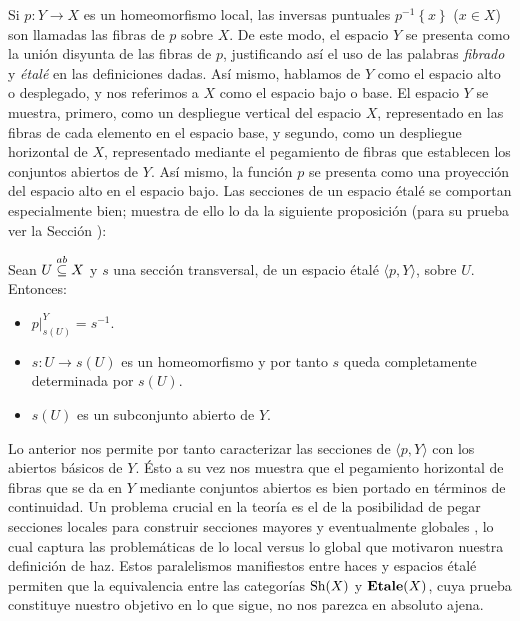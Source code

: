 Si $p:Y\to X$ es un homeomorfismo local, las inversas puntuales $p^{-1}\left\lbrace x\right\rbrace$ ($x\in X$) son llamadas las fibras de $p$ sobre $X$. De este modo, el espacio $Y$ se presenta como la unión disyunta de las fibras de $p$, justificando así el uso de las palabras \textit{fibrado} y \textit{étalé} en las definiciones dadas. Así mismo, hablamos de $Y$ como el espacio alto o desplegado, y nos referimos a $X$ como el espacio bajo o base. El espacio $Y$ se muestra, primero, como un despliegue vertical del espacio $X$, representado en las fibras de cada elemento en el espacio base, y segundo, como un despliegue horizontal de $X$, representado mediante el pegamiento de fibras que establecen los conjuntos abiertos de $Y$. Así mismo, la función $p$ se presenta como una proyección del espacio alto en el espacio bajo. Las secciones de un espacio étalé se comportan especialmente bien; muestra de ello lo da la siguiente proposición (para su prueba ver la Sección ):
\begin{Prop}
   Sean $U\stackrel{ab}{\subseteq} X$ y $s$ una sección transversal, de un espacio étalé $\langle p, Y\rangle$, sobre $U$. Entonces:
   \begin{itemize}
      \item $p|^{Y}_{s(U)}=s^{-1}$.
      \item $s:U\to s(U)$ es un homeomorfismo y por tanto $s$ queda completamente determinada por $s(U)$.
      \item $s(U)$ es un subconjunto abierto de $Y$.
   \end{itemize}
\end{Prop}
Lo anterior nos permite por tanto caracterizar las secciones de $\langle p, Y\rangle$ con los abiertos básicos de $Y$. Ésto a su vez nos muestra que el pegamiento horizontal de fibras que se da en $Y$ mediante conjuntos abiertos es bien portado en términos de continuidad. Un problema crucial en la teoría es el de la posibilidad de pegar secciones locales para construir secciones mayores y eventualmente globales \cite{MHPM}, lo cual captura las problemáticas de lo local versus lo global que motivaron nuestra definición de haz. Estos paralelismos manifiestos entre haces y espacios étalé permiten que la equivalencia entre las categorías $\normalfont{\text{Sh}} (X)$ y $\normalfont{\textbf{Etale}} (X)$, cuya prueba constituye nuestro objetivo en lo que sigue, no nos parezca en absoluto ajena.
